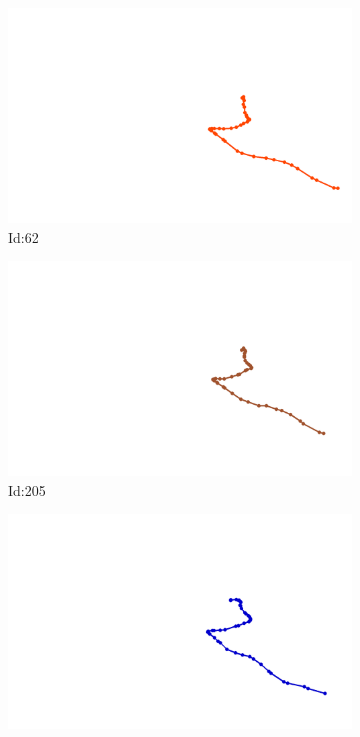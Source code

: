 \documentclass[12pt,twoside]{report}
\begin{document}
\begin{figure}
\centering
\begin{subfigure}[b]{0.20\textwidth}
\centering
\includegraphics[width=\textwidth]{../../trajectories/62.png}
\caption{Id:62}
\end{subfigure}
\begin{subfigure}[b]{0.20\textwidth}
\centering
\includegraphics[width=\textwidth]{../../trajectories/205.png}
\caption{Id:205}
\end{subfigure}
\begin{subfigure}[b]{0.20\textwidth}
\centering
\includegraphics[width=\textwidth]{../../trajectories/431.png}

\end{subfigure}
\end{figure}
\end{document}
